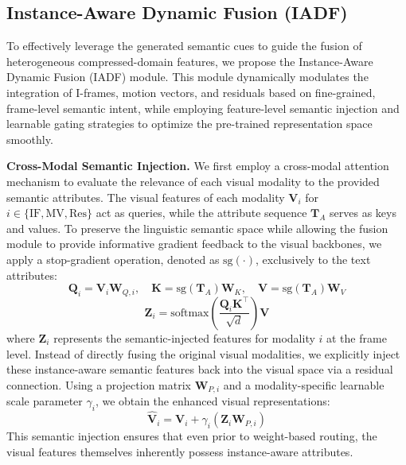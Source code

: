 \documentclass[letterpaper]{article} %
\begin{document}
\subsection{Instance-Aware Dynamic Fusion (IADF)}
\label{sec:fusion}

To effectively leverage the generated semantic cues to guide the fusion of heterogeneous compressed-domain features, we propose the Instance-Aware Dynamic Fusion (IADF) module. This module dynamically modulates the integration of I-frames, motion vectors, and residuals based on fine-grained, frame-level semantic intent, while employing feature-level semantic injection and learnable gating strategies to optimize the pre-trained representation space smoothly.

\noindent\textbf{Cross-Modal Semantic Injection.} 
We first employ a cross-modal attention mechanism to evaluate the relevance of each visual modality to the provided semantic attributes. The visual features of each modality $\mathbf{V}_i$ for $i \in \{\text{IF}, \text{MV}, \text{Res}\}$ act as queries, while the attribute sequence $\mathbf{T}_A$ serves as keys and values. To preserve the linguistic semantic space while allowing the fusion module to provide informative gradient feedback to the visual backbones, we apply a stop-gradient operation, denoted as $\text{sg}(\cdot)$, exclusively to the text attributes:
$$\mathbf{Q}_i = \mathbf{V}_i\mathbf{W}_{Q,i}, \quad \mathbf{K} = \text{sg}(\mathbf{T}_A)\mathbf{W}_K, \quad \mathbf{V} = \text{sg}(\mathbf{T}_A)\mathbf{W}_V$$
$$\mathbf{Z}_i = \text{softmax}\left(\frac{\mathbf{Q}_i \mathbf{K}^\top}{\sqrt{d}}\right)\mathbf{V}$$
where $\mathbf{Z}_i$ represents the semantic-injected features for modality $i$ at the frame level. Instead of directly fusing the original visual modalities, we explicitly inject these instance-aware semantic features back into the visual space via a residual connection. Using a projection matrix $\mathbf{W}_{P,i}$ and a modality-specific learnable scale parameter $\gamma_i$, we obtain the enhanced visual representations:
$$\hat{\mathbf{V}}_i = \mathbf{V}_i + \gamma_i (\mathbf{Z}_i \mathbf{W}_{P,i})$$
This semantic injection ensures that even prior to weight-based routing, the visual features themselves inherently possess instance-aware attributes.
\end{document}
